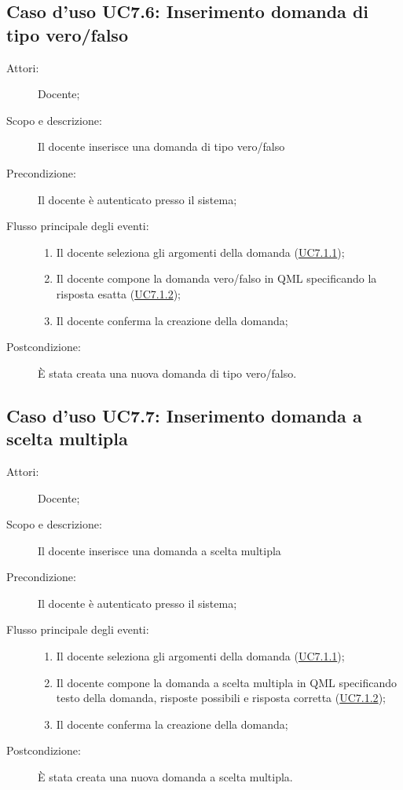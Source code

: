\subsection{Caso d'uso UC7.6: Inserimento domanda di tipo vero/falso}\begin{description}
\item[Attori:] Docente;
\item[Scopo e descrizione:] Il docente inserisce una domanda di tipo vero/falso
      \item[Precondizione:] Il docente è autenticato presso il sistema;

        \item[Flusso principale degli eventi:] \begin{enumerate}
          \item Il docente seleziona gli argomenti della domanda (\hyperlink{UC7.1.1}{UC7.1.1});
          \item Il docente compone la domanda vero/falso in QML specificando la risposta esatta (\hyperlink{UC7.1.2}{UC7.1.2});
          \item Il docente conferma la creazione della domanda;

      \end{enumerate}
    \item[Postcondizione:] È stata creata una nuova domanda di tipo vero/falso.
  \end{description}
\hypertarget{UC7.7}{}
\subsection{Caso d'uso UC7.7: Inserimento domanda a scelta multipla}\begin{description}
\item[Attori:] Docente;
\item[Scopo e descrizione:] Il docente inserisce una domanda a scelta multipla
      \item[Precondizione:] Il docente è autenticato presso il sistema;

        \item[Flusso principale degli eventi:] \begin{enumerate}
          \item Il docente seleziona gli argomenti della domanda (\hyperlink{UC7.1.1}{UC7.1.1});
          \item Il docente compone la domanda a scelta multipla in QML specificando testo della domanda, risposte possibili e risposta corretta (\hyperlink{UC7.1.2}{UC7.1.2});
          \item Il docente conferma la creazione della domanda;

      \end{enumerate}
    \item[Postcondizione:] È stata creata una nuova domanda a scelta multipla.
  \end{description}
\hypertarget{UC7.8}{}
